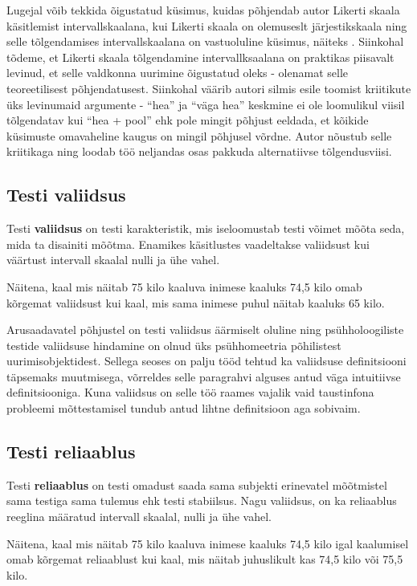 \documentclass[a4paper,12pt]{article}
\numberwithin{equation}{section}
\theoremstyle{definition}
\begin{document}
Lugejal võib tekkida õigustatud k\"usimus, kuidas põhjendab autor Likerti skaala käsitlemist intervallskaalana, kui Likerti skaala on olemuseslt järjestikskaala ning selle tõlgendamises intervallskaalana on vastuoluline küsimus, näiteks \cite{Jamieson2004}. Siinkohal tõdeme, et Likerti skaala tõlgendamine intervallksaalana on praktikas piisavalt levinud, et selle valdkonna uurimine õigustatud oleks - olenamat selle teoreetilisest põhjendatusest.  Siinkohal väärib autori silmis esile toomist kriitikute \"uks levinumaid argumente -  "`hea"'  ja "`väga hea"'  keskmine ei ole  loomulikul viisil tõlgendatav kui "`hea + pool"' ehk pole mingit põhjust eeldada, et kõikide küsimuste omavaheline kaugus on mingil põhjusel võrdne. Autor nõustub selle kriitikaga ning loodab töö neljandas osas pakkuda alternatiivse tõlgendusviisi. 



\subsection{Testi valiidsus}

Testi \textbf{valiidsus} on testi karakteristik, mis iseloomustab testi võimet mõõta seda, mida ta disainiti mõõtma. Enamikes käsitlustes vaadeltakse valiidsust kui väärtust intervall skaalal nulli ja ühe vahel.

Näitena, kaal mis näitab 75 kilo kaaluva inimese kaaluks 74,5 kilo omab kõrgemat valiidsust kui kaal, mis sama inimese puhul näitab kaaluks 65 kilo.   

Arusaadavatel põhjustel on testi valiidsus äärmiselt oluline ning psühholoogiliste testide valiidsuse hindamine on olnud üks psühhomeetria põhilistest uurimisobjektidest. Sellega seoses on palju tööd tehtud ka valiidsuse definitsiooni täpsemaks muutmisega, võrreldes selle paragrahvi alguses antud väga intuitiivse definitsiooniga. Kuna valiidsus on selle töö raames vajalik vaid taustinfona probleemi mõttestamisel tundub antud lihtne definitsioon aga sobivaim. 

\subsection{Testi reliaablus}

Testi \textbf{reliaablus} on testi omadust saada sama subjekti erinevatel mõõtmistel sama testiga sama tulemus ehk testi stabiilsus. Nagu valiidsus, on ka reliaablus reeglina määratud intervall skaalal, nulli ja ühe vahel. 

Näitena, kaal mis näitab 75 kilo kaaluva inimese kaaluks 74,5 kilo igal kaalumisel omab kõrgemat reliaablust kui kaal, mis näitab juhuslikult kas 74,5 kilo või 75,5 kilo. 
\end{document}
